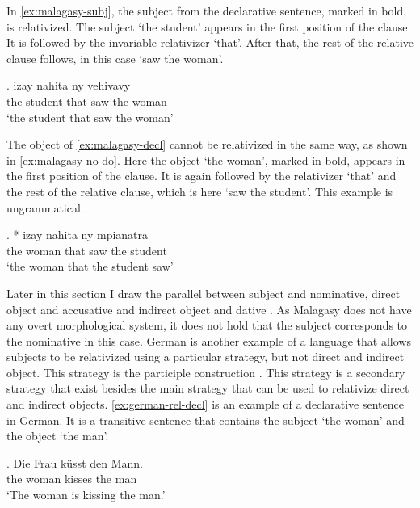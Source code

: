 In \ref{ex:malagasy-subj}, the subject from the declarative sentence, marked in bold, is relativized. The subject  `the student' appears in the first position of the clause. It is followed by the invariable relativizer  `that'. After that, the rest of the relative clause follows, in this case  `saw the woman'.

\exg.   izay nahita ny vehivavy\\
 the student that saw the woman\\
 `the student that saw the woman' \label{ex:malagasy-subj}

The object of \ref{ex:malagasy-decl} cannot be relativized in the same way, as shown in \ref{ex:malagasy-no-do}. Here the object  `the woman', marked in bold, appears in the first position of the clause. It is again followed by the relativizer  `that' and the rest of the relative clause, which is here  `saw the student'. This example is ungrammatical.

\exg. *  izay nahita ny mpianatra\\
 the woman that saw the student\\
 `the woman that the student saw' \label{ex:malagasy-no-do}

Later in this section I draw the parallel between subject and nominative, direct object and accusative and indirect object and dative \citep[after][]{caha2009}. As Malagasy does not have any overt morphological system, it does not hold that the subject corresponds to the nominative in this case.
German is another example of a language that allows subjects to be relativized using a particular strategy, but not direct and indirect object. This strategy is the participle construction \citep{keenan1977}. This strategy is a secondary strategy that exist besides the main strategy that can be used to relativize direct and indirect objects. \ref{ex:german-rel-decl} is an example of a declarative sentence in German. It is a transitive sentence that contains the subject  `the woman' and the object  `the man'.

\exg. Die Frau küsst den Mann.\\
the woman kisses the man\\
`The woman is kissing the man.' \label{ex:german-rel-decl}

